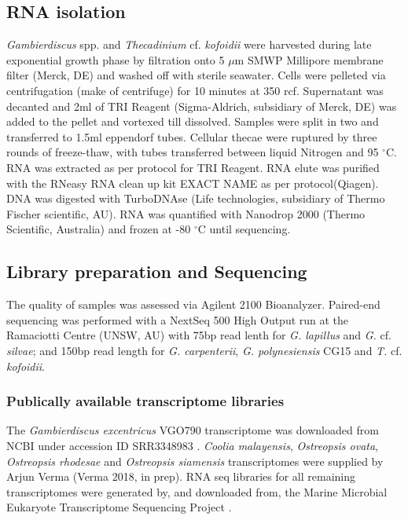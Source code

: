 \documentclass[12pt]{article}
\begin{document}
\subsection*{RNA isolation}
\emph{Gambierdiscus} spp. and \emph{Thecadinium} cf. \emph{kofoidii} were harvested during late exponential growth phase by filtration onto 5 $\mu$m SMWP Millipore membrane filter (Merck, DE) and washed off with sterile seawater. 
Cells were pelleted via centrifugation (make of centrifuge) for 10 minutes at 350 rcf. 
Supernatant was decanted and 2ml of TRI Reagent (Sigma-Aldrich, subsidiary of Merck, DE) was added to the pellet and vortexed till dissolved. 
Samples were split in two and transferred to 1.5ml eppendorf tubes. 
Cellular thecae were ruptured by three rounds of freeze-thaw, with tubes transferred between liquid Nitrogen and 95 $^{\circ}$C. 
RNA was extracted as per protocol for TRI Reagent. 
RNA elute was purified with the RNeasy RNA clean up kit EXACT NAME as per protocol(Qiagen). 
DNA was digested with TurboDNAse (Life technologies, subsidiary of Thermo Fischer scientific, AU). 
RNA was quantified with Nanodrop 2000 (Thermo Scientific, Australia) and frozen at -80 $^{\circ}$C until sequencing.
 
\subsection*{Library preparation and Sequencing}
The quality of samples was assessed via Agilent 2100 Bioanalyzer. 
Paired-end sequencing was performed with a NextSeq 500 High Output run at the Ramaciotti Centre (UNSW, AU) with 75bp read lenth for \emph{G. lapillus} and \emph{G.} cf. \emph{silvae}; and 150bp read length for \emph{G. carpenterii}, \emph{G. polynesiensis} CG15 and \emph{T.} cf. \emph{kofoidii}.

\subsubsection*{Publically available transcriptome libraries}
The \emph{Gambierdiscus excentricus} VGO790 transcriptome was downloaded from NCBI under accession ID SRR3348983 \cite{kohli2017role}. 
\textit{Coolia malayensis}, \textit{Ostreopsis ovata}, \textit{Ostreopsis rhodesae} and \textit{Ostreopsis siamensis} transcriptomes were supplied by Arjun Verma (Verma 2018, in prep). 
RNA seq libraries for all remaining transcriptomes were generated by, and downloaded from, the Marine Microbial Eukaryote Transcriptome Sequencing Project \citep{keeling2014marine}.
\end{document}

